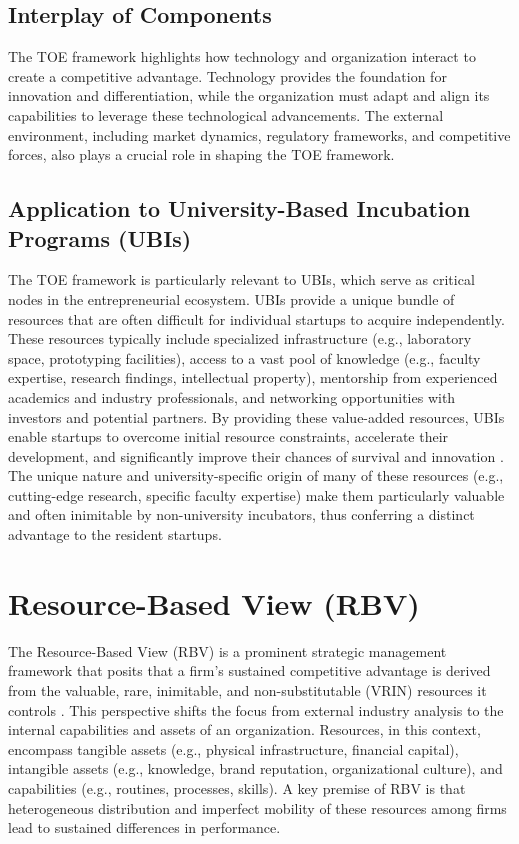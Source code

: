 \documentclass[../Main.tex]{subfiles}
\begin{document}
\subsection{Interplay of Components}
The TOE framework highlights how technology and organization interact to create a competitive advantage. Technology provides the foundation for innovation and differentiation, while the organization must adapt and align its capabilities to leverage these technological advancements. The external environment, including market dynamics, regulatory frameworks, and competitive forces, also plays a crucial role in shaping the TOE framework.

\subsection{Application to University-Based Incubation Programs (UBIs)}
The TOE framework is particularly relevant to UBIs, which serve as critical nodes in the entrepreneurial ecosystem. UBIs provide a unique bundle of resources that are often difficult for individual startups to acquire independently. These resources typically include specialized infrastructure (e.g., laboratory space, prototyping facilities), access to a vast pool of knowledge (e.g., faculty expertise, research findings, intellectual property), mentorship from experienced academics and industry professionals, and networking opportunities with investors and potential partners. By providing these value-added resources, UBIs enable startups to overcome initial resource constraints, accelerate their development, and significantly improve their chances of survival and innovation \cite{mian1996assessing}. The unique nature and university-specific origin of many of these resources (e.g., cutting-edge research, specific faculty expertise) make them particularly valuable and often inimitable by non-university incubators, thus conferring a distinct advantage to the resident startups.

\section{Resource-Based View (RBV)}

The Resource-Based View (RBV) is a prominent strategic management framework that posits that a firm's sustained competitive advantage is derived from the valuable, rare, inimitable, and non-substitutable (VRIN) resources it controls \cite{barney1991firm}. This perspective shifts the focus from external industry analysis to the internal capabilities and assets of an organization. Resources, in this context, encompass tangible assets (e.g., physical infrastructure, financial capital), intangible assets (e.g., knowledge, brand reputation, organizational culture), and capabilities (e.g., routines, processes, skills). A key premise of RBV is that heterogeneous distribution and imperfect mobility of these resources among firms lead to sustained differences in performance.
\end{document}
